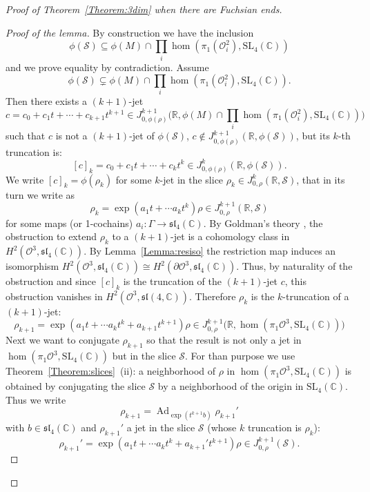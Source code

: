 \documentclass[a4paper,11pt]{article}
\begin{document}
\begin{proof}[Proof of Theorem~\ref{Theorem:3dim}
 when there are Fuchsian ends]
\begin{proof}[Proof of the lemma]
By construction we have the inclusion
 $$\phi(\mathcal S)\subseteq\phi(M)\cap \prod_i \hom(\pi_1(\mathcal O^2_i),\mathrm{SL}_4(\mathbb C))$$
and we prove equality
by contradiction. Assume
$$\phi(\mathcal S)\subsetneq\phi(M)\cap \prod_i \hom(\pi_1(\mathcal O^2_i),\mathrm{SL}_4(\mathbb C)).$$ 
Then there exists a $(k+1)$-jet 
$$
c=c_0+c_1 t+\cdots + c_{k+1} t^{k+1}
\in J^{k+1}_{0,\phi(\rho)}\big(\mathbb R,   \phi(M)\cap \prod_i \hom(\pi_1(\mathcal O^2_i),\mathrm{SL}_4(\mathbb C) )\big)  
$$ 
such that
$c$ is not a $(k+1)$-jet of $\phi(\mathcal{S})$,
$c \not\in 
 J^{k+1}_{0,\phi(\rho)}(\mathbb R,   \phi(\mathcal{S}))$,
but 
its $k$-th truncation is:
$$
[c]_k=c_0+c_1 t+\cdots + c_{k} t^{k}
\in J^{k}_{0,\phi(\rho)}(\mathbb R,   \phi(\mathcal{S})).
$$
We write $[c]_k=\phi( \rho_k)$ for some $k$-jet in the slice $\rho_k\in J^k_{0, \rho}(\mathbb R, \mathcal S)$, that in its turn we write as
$$
\rho_k=\exp(a_1 t+\cdots a_k t^k)\rho \in J^{k+1}_{0,\rho} (\mathbb R, \mathcal S)
$$
for some maps (or 1-cochains) $a_i\colon\Gamma \to \mathfrak{sl}_4(\mathbb C)$.
By Goldman's theory \cite{Goldman,HPS},
the obstruction to extend $\rho_k$ to a $(k+1)$-jet
is a cohomology class in $H^2(\mathcal O^3,\mathfrak{sl}_4(\mathbb C))$.
By  Lemma~\ref{Lemma:resiso} the restriction map induces an isomorphism 
$H^2(\mathcal O^3,\mathfrak{sl}_4(\mathbb C))\cong H^2(\partial\mathcal O^3,\mathfrak{sl}_4(\mathbb C))$.
Thus, by naturality of the obstruction and since $[c]_k$ is the truncation of the $(k+1)$-jet $c$, this obstruction vanishes
in $H^2(\mathcal{O}^3,\mathfrak{sl}(4,\mathbb C))$. 
Therefore $\rho_k$ is the $k$-truncation of a $(k+1)$-jet:
$$
\rho_{k+1}=\exp(a_1 t+\cdots a_k t^k+a_{k+1} t^{k+1} ) \rho \in J^{k+1}_{0,\rho} 
\big(\mathbb R, \hom(\pi_1 \mathcal O^3, \mathrm{SL}_4(\mathbb C) )\big) 
$$
Next we want to conjugate $\rho_{k+1}$ so that the result is not only a jet in
$ \hom(\pi_1 \mathcal O^3, \mathrm{SL}_4(\mathbb C) )$ but in
the slice $\mathcal S$. For than purpose we use
Theorem~\ref{Theorem:slices}~(ii): 
a neighborhood of $\rho$ in $ \hom(\pi_1 \mathcal O^3, \mathrm{SL}_4(\mathbb C) )$
is obtained by conjugating 
the slice $\mathcal S$ by a neighborhood of the origin in $\mathrm{SL}_4(\mathbb C) $. Thus we write
$$
\rho_{k+1}=\operatorname{Ad}_{\exp (t^{k+1} b)} \rho_{k+1}'
$$
with $b\in\mathfrak{sl}_4(\mathbb C)$ and $\rho_{k+1}'   $  a jet in the slice $\mathcal S$
(whose $k$ truncation is $\rho_k$):
$$
\rho_{k+1}'=
\exp(a_1 t+\cdots a_k t^k+a_{k+1}' t^{k+1} ) \rho \in J^{k+1}_{0,\rho} (\mathcal{S}) .
$$
\end{proof}
\end{proof}
\end{document}
